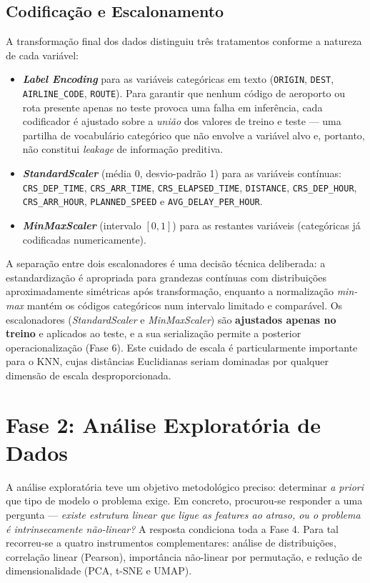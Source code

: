 \documentclass[conference]{IEEEtran}
\begin{document}
\subsection{Codificação e Escalonamento}
A transformação final dos dados distinguiu três tratamentos conforme a natureza
de cada variável:
\begin{itemize}
\item \textbf{\textit{Label Encoding}} para as variáveis categóricas em texto
      (\texttt{ORIGIN}, \texttt{DEST}, \texttt{AIRLINE\_CODE}, \texttt{ROUTE}).
      Para garantir que nenhum código de aeroporto ou rota presente apenas no
      teste provoca uma falha em inferência, cada codificador é ajustado sobre a
      \emph{união} dos valores de treino e teste — uma partilha de vocabulário
      categórico que não envolve a variável alvo e, portanto, não constitui
      \textit{leakage} de informação preditiva.
\item \textbf{\textit{StandardScaler}} (média 0, desvio-padrão 1) para as
      variáveis contínuas: \texttt{CRS\_DEP\_TIME}, \texttt{CRS\_ARR\_TIME},
      \texttt{CRS\_ELAPSED\_TIME}, \texttt{DISTANCE}, \texttt{CRS\_DEP\_HOUR},
      \texttt{CRS\_ARR\_HOUR}, \texttt{PLANNED\_SPEED} e
      \texttt{AVG\_DELAY\_PER\_HOUR}.
\item \textbf{\textit{MinMaxScaler}} (intervalo $[0,1]$) para as restantes
      variáveis (categóricas já codificadas numericamente).
\end{itemize}
A separação entre dois escalonadores é uma decisão técnica deliberada: a
estandardização é apropriada para grandezas contínuas com distribuições
aproximadamente simétricas após transformação, enquanto a normalização
\textit{min-max} mantém os códigos categóricos num intervalo limitado e
comparável. Os escalonadores (\textit{StandardScaler} e \textit{MinMaxScaler})
são \textbf{ajustados apenas no treino} e aplicados ao teste, e a sua
serialização permite a posterior operacionalização (Fase 6). Este cuidado de
escala é particularmente importante para o
KNN, cujas distâncias Euclidianas seriam dominadas por qualquer dimensão de
escala desproporcionada.

\section{Fase 2: Análise Exploratória de Dados}

A análise exploratória teve um objetivo metodológico preciso: determinar
\emph{a priori} que tipo de modelo o problema exige. Em concreto, procurou-se
responder a uma pergunta — \textit{existe estrutura linear que ligue as
\textit{features} ao atraso, ou o problema é intrinsecamente não-linear?} A
resposta condiciona toda a Fase 4. Para tal recorreu-se a quatro instrumentos
complementares: análise de distribuições, correlação linear (Pearson),
importância não-linear por permutação, e redução de dimensionalidade (PCA,
t-SNE e UMAP).
\end{document}
